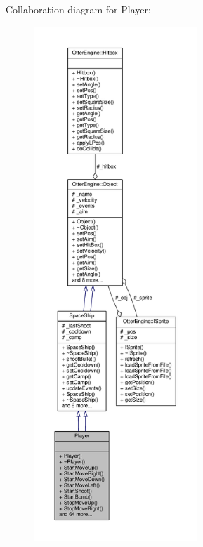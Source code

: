 Collaboration diagram for Player\+:\nopagebreak
\begin{figure}[H]
\begin{center}
\leavevmode
\includegraphics[height=550pt]{d6/db3/class_player__coll__graph}
\end{center}
\end{figure}
